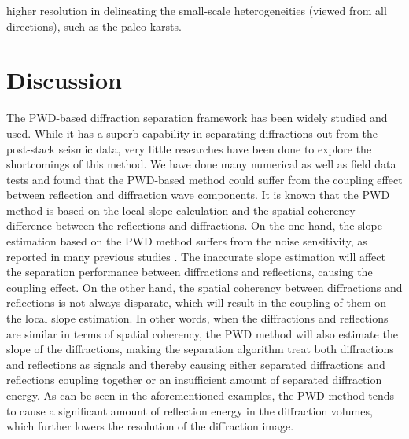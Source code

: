 \documentclass[10pt]{IEEEtran}
\begin{document}
higher resolution in delineating the small-scale heterogeneities (viewed from all directions), such as the paleo-karsts. 

\section{Discussion}
The PWD-based diffraction separation framework has been widely studied and used. While it has a superb capability in separating diffractions out from the post-stack seismic data, very little researches have been done to explore the shortcomings of this method. We have done many numerical as well as field data tests and found that the PWD-based method could suffer from the coupling effect between reflection and diffraction wave components. It is known that the PWD method is based on the local slope calculation and the spatial coherency difference between the reflections and diffractions. On the one hand, the slope estimation based on the PWD method suffers from the noise sensitivity, as reported in many previous studies \cite{shaohuan2017,wanghang2020tgrs2,chenwei2021geo,chenwei2021tgrs2}. The inaccurate slope estimation will affect the separation performance between diffractions and reflections, causing the coupling effect. On the other hand, the spatial coherency between diffractions and reflections is not always disparate, which will result in the coupling of them on the local slope estimation. In other words, when the diffractions and reflections are similar in terms of spatial coherency, the PWD method will also estimate the slope of the diffractions, making the separation algorithm treat both diffractions and reflections as signals and thereby causing either separated diffractions and reflections coupling together or an insufficient amount of separated diffraction energy. As can be seen in the aforementioned examples, the PWD method tends to cause a significant amount of reflection energy in the diffraction volumes, which further lowers the resolution of the diffraction image.
\end{document}
